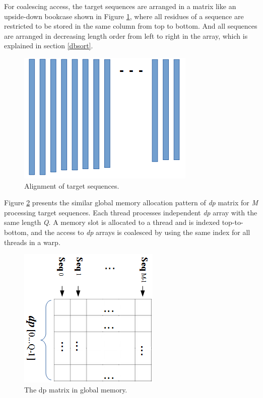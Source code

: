 For coalescing access, the target sequences are arranged in a matrix like an upside-down bookcase shown in Figure \ref{fig:dbalign}, where all residues of a sequence are restricted to be stored in the same column from top to bottom. And all sequences are arranged in decreasing length order from left to right in the array, which is explained in section \ref{dbsort}. 

\begin{figure}[!htb]
	\centering
	\includegraphics[totalheight=0.2\textheight]{Figures/dbalign.png}
	\caption{\selectfont Alignment of target sequences.}
	\label{fig:dbalign}
\end{figure}

Figure \ref{fig:dp} presents the similar global memory allocation pattern of \emph{dp} matrix for \emph{M} processing target sequences. Each thread processes independent \emph{dp} array with the same length \emph{Q}. A memory slot is allocated to a thread and is indexed top-to-bottom, and the access to \emph{dp} arrays is coalesced by using the same index for all threads in a warp.

\begin{figure}[!htb]
	\centering
	\includegraphics[totalheight=0.2\textheight]{Figures/dp.png}
	\caption{\selectfont The dp matrix in global memory.}
	\label{fig:dp}
\end{figure}

